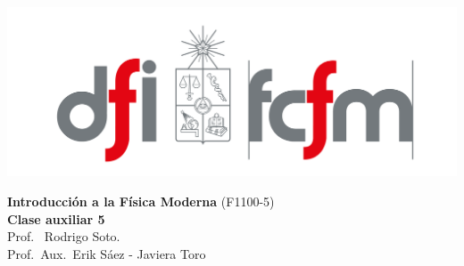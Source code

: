 \documentclass[
  11pt,
  letterpaper,
   addpoints,
   answers
  ]{exam}
\begin{document}
\pagestyle{headandfoot}

\noindent
\begin{minipage}{0.47\textwidth}
\includegraphics[width=\textwidth]{../fcfm_die.png}
\end{minipage}
\begin{minipage}{0.53\textwidth}
\begin{center} 
\large\textbf{Introducción a la Física Moderna} (F1100-5) \\
\large\textbf{Clase auxiliar 5} \\
\normalsize Prof.~ Rodrigo Soto.\\
\normalsize Prof.~Aux.~Erik Sáez - Javiera Toro 
\end{center}
\end{minipage}

\vspace{0.5cm}
\noindent
\vspace{.85cm}
\end{document}
